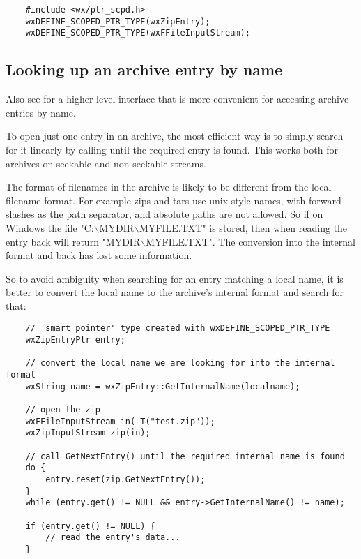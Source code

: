 \begin{verbatim}
    #include <wx/ptr_scpd.h>
    wxDEFINE_SCOPED_PTR_TYPE(wxZipEntry);
    wxDEFINE_SCOPED_PTR_TYPE(wxFFileInputStream);

\end{verbatim}


\subsection{Looking up an archive entry by name}\label{wxarcbyname}


Also see  for a higher level interface that is
more convenient for accessing archive entries by name.

To open just one entry in an archive, the most efficient way is
to simply search for it linearly by calling
  until the
required entry is found. This works both for archives on seekable and
non-seekable streams.

The format of filenames in the archive is likely to be different
from the local filename format. For example zips and tars use
unix style names, with forward slashes as the path separator,
and absolute paths are not allowed. So if on Windows the file
"C:$\backslash$MYDIR$\backslash$MYFILE.TXT" is stored, then when reading
the entry back  will return
"MYDIR$\backslash$MYFILE.TXT". The conversion into the internal format
and back has lost some information.

So to avoid ambiguity when searching for an entry matching a local name,
it is better to convert the local name to the archive's internal format
and search for that:

\begin{verbatim}
    // 'smart pointer' type created with wxDEFINE_SCOPED_PTR_TYPE
    wxZipEntryPtr entry;

    // convert the local name we are looking for into the internal format
    wxString name = wxZipEntry::GetInternalName(localname);

    // open the zip
    wxFFileInputStream in(_T("test.zip"));
    wxZipInputStream zip(in);

    // call GetNextEntry() until the required internal name is found
    do {
        entry.reset(zip.GetNextEntry());
    }
    while (entry.get() != NULL && entry->GetInternalName() != name);

    if (entry.get() != NULL) {
        // read the entry's data...
    }

\end{verbatim}

